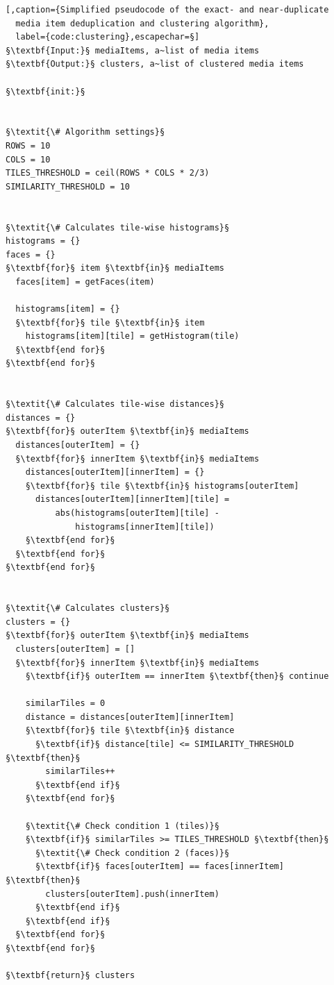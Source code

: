 \begin{lstlisting}[,caption={Simplified pseudocode of the exact- and near-duplicate
  media item deduplication and clustering algorithm},
  label={code:clustering},escapechar=§]
§\textbf{Input:}§ mediaItems, a~list of media items
§\textbf{Output:}§ clusters, a~list of clustered media items

§\textbf{init:}§


§\textit{\# Algorithm settings}§
ROWS = 10
COLS = 10
TILES_THRESHOLD = ceil(ROWS * COLS * 2/3)
SIMILARITY_THRESHOLD = 10


§\textit{\# Calculates tile-wise histograms}§
histograms = {}
faces = {}
§\textbf{for}§ item §\textbf{in}§ mediaItems
  faces[item] = getFaces(item)
  
  histograms[item] = {}
  §\textbf{for}§ tile §\textbf{in}§ item
    histograms[item][tile] = getHistogram(tile)
  §\textbf{end for}§
§\textbf{end for}§  

    
§\textit{\# Calculates tile-wise distances}§
distances = {}
§\textbf{for}§ outerItem §\textbf{in}§ mediaItems
  distances[outerItem] = {}
  §\textbf{for}§ innerItem §\textbf{in}§ mediaItems
    distances[outerItem][innerItem] = {}
    §\textbf{for}§ tile §\textbf{in}§ histograms[outerItem]
      distances[outerItem][innerItem][tile] =
          abs(histograms[outerItem][tile] -
              histograms[innerItem][tile])
    §\textbf{end for}§
  §\textbf{end for}§
§\textbf{end for}§

  
§\textit{\# Calculates clusters}§
clusters = {}
§\textbf{for}§ outerItem §\textbf{in}§ mediaItems  
  clusters[outerItem] = []  
  §\textbf{for}§ innerItem §\textbf{in}§ mediaItems
    §\textbf{if}§ outerItem == innerItem §\textbf{then}§ continue
    
    similarTiles = 0
    distance = distances[outerItem][innerItem]
    §\textbf{for}§ tile §\textbf{in}§ distance      
      §\textbf{if}§ distance[tile] <= SIMILARITY_THRESHOLD §\textbf{then}§
        similarTiles++
      §\textbf{end if}§
    §\textbf{end for}§
         
    §\textit{\# Check condition 1 (tiles)}§
    §\textbf{if}§ similarTiles >= TILES_THRESHOLD §\textbf{then}§
      §\textit{\# Check condition 2 (faces)}§
      §\textbf{if}§ faces[outerItem] == faces[innerItem] §\textbf{then}§
        clusters[outerItem].push(innerItem)
      §\textbf{end if}§
    §\textbf{end if}§    
  §\textbf{end for}§
§\textbf{end for}§

§\textbf{return}§ clusters        
\end{lstlisting}

